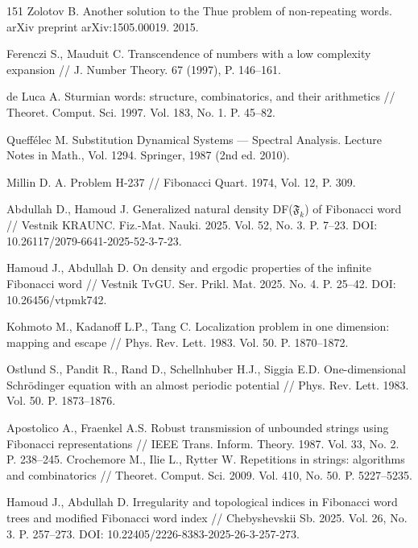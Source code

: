 \documentclass[a4paper,14pt]{extreport}
\theoremstyle{plain}
\theoremstyle{definition}
\theoremstyle{remark}
\begin{document}
\begin{thebibliography}{151}
		Zolotov B. Another solution to the Thue problem of non-repeating words. arXiv preprint arXiv:1505.00019. 2015.
		
		Ferenczi S., Mauduit C. Transcendence of numbers with a low complexity expansion // J. Number Theory. 67 (1997),  P.  146--161.
		
		de Luca A. Sturmian words: structure, combinatorics, and their arithmetics // Theoret. Comput. Sci. 1997. Vol. 183, No. 1. P. 45--82.
		
		Queff\'elec M. Substitution Dynamical Systems --- Spectral Analysis. Lecture Notes in Math., Vol. 1294. Springer, 1987 (2nd ed. 2010).
		
		Millin D. A. Problem H-237 // Fibonacci Quart. 1974, Vol. 12, P. 309.
		
		Abdullah D., Hamoud J. Generalized natural density DF($\mathfrak F_k$) of Fibonacci word // Vestnik KRAUNC. Fiz.-Mat. Nauki. 2025. Vol. 52, No. 3. P. 7--23. DOI: 10.26117/2079-6641-2025-52-3-7-23.
		
		Hamoud J., Abdullah D. On density and ergodic properties of the infinite Fibonacci word // Vestnik TvGU. Ser. Prikl. Mat. 2025. No. 4. P. 25--42. DOI: 10.26456/vtpmk742.
		
		Kohmoto M., Kadanoff L.P., Tang C. Localization problem in one dimension: mapping and escape // Phys. Rev. Lett. 1983. Vol. 50. P. 1870--1872.
		
		Ostlund S., Pandit R., Rand D., Schellnhuber H.J., Siggia E.D. One-dimensional Schr\"odinger equation with an almost periodic potential // Phys. Rev. Lett. 1983. Vol. 50. P. 1873--1876.
		
		Apostolico A., Fraenkel A.S. Robust transmission of unbounded strings using Fibonacci representations // IEEE Trans. Inform. Theory. 1987. Vol. 33, No. 2. P. 238--245.
		Crochemore M., Ilie L., Rytter W. Repetitions in strings: algorithms and combinatorics // Theoret. Comput. Sci. 2009. Vol. 410, No. 50. P. 5227--5235.
		
		Hamoud J., Abdullah D. Irregularity and topological indices in Fibonacci word trees and modified Fibonacci word index // Chebyshevskii Sb. 2025. Vol. 26, No. 3. P. 257--273. DOI: 10.22405/2226-8383-2025-26-3-257-273.
		
	\end{thebibliography}
	
\end{document}
